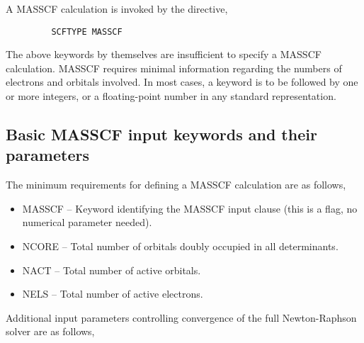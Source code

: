 \documentclass[11pt,fleqn]{article}
\begin{document}
A MASSCF calculation is invoked by the directive,

{\footnotesize
\begin{verbatim}
         SCFTYPE MASSCF
\end{verbatim}
}

The above keywords by themselves are insufficient to specify a MASSCF 
calculation. MASSCF requires minimal information regarding the numbers 
of electrons and orbitals involved. In most cases, a keyword is to be 
followed by one or more integers, or a floating-point number in any 
standard representation.\\

\subsection[Basic MASSCF input keywords and their parameters]{Basic MASSCF input keywords and their parameters}

The minimum requirements for defining a MASSCF calculation are as 
follows,

\begin{itemize}
\item  MASSCF -- Keyword identifying the MASSCF input clause 
(this is a flag, no numerical parameter needed). 
\item  NCORE  -- Total number of orbitals doubly occupied in all
determinants.  
\item  NACT   -- Total number of active orbitals.  
\item  NELS   -- Total number of active electrons.  
\end{itemize}

Additional input parameters controlling convergence of the full 
Newton-Raphson solver are as follows,
\end{document}
